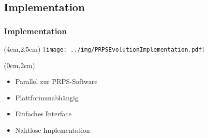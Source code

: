 \subsection{Implementation}
\begin{frame}
%
  	\frametitle{Implementation}
%  	
	\begin{textblock*}{8cm}(4cm,2.5cm) %
		\centering
  		\texttt{[image: ../img/PRPSEvolutionImplementation.pdf]}
  	\end{textblock*}
%  	
	\begin{textblock*}{4cm}(0cm,2cm) %
  			\begin{itemize}
  				\item Parallel zur PRPS-Software
  				\item Plattform\-unabhängig
   				\item Einfaches Interface
   				\item Nahtlose Implementation
  		  	\end{itemize}
  	\end{textblock*}
  
%  	
\end{frame}